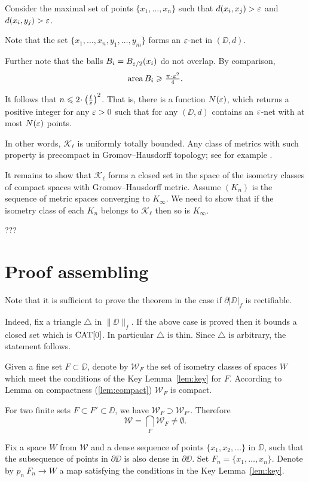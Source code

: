 \documentclass[a4paper,10pt]{amsart}
\begin{document}
Consider the maximal set of points $\{x_1,\dots,x_n\}$ such that $d(x_i,x_j)>\varepsilon$ and $d(x_i,y_j)>\varepsilon$.

Note that the set $\{x_1,\dots,x_n,y_1,\dots,y_m\}$
forms an $\varepsilon$-net in $(\DD,d)$.

Further note that the balls $B_i=B_{\varepsilon/2}(x_i)$
do not overlap.
By comparison,
\[\area B_i\ge \tfrac{\pi\cdot\eps^2}{4}.\]

It follows that $n\le 2\cdot\left(\tfrac\ell\eps\right)^2$.
That is, there is a function $N(\varepsilon)$,
which returns a positive integer for any $\varepsilon>0$
such that for any 
$(\DD,d)$ contains an $\varepsilon$-net
with at most $N(\varepsilon)$ points.

In other words, $\mathcal{K}_\ell$ is uniformly totally bounded.
Any class of metrics with such property is precompact in Gromov--Hausdorff topology; 
see for example \cite[7.4.15]{BBI}.

It remains to show that  $\mathcal{K}_\ell$ forms a closed set in the space of the isometry classes of compact spaces with Gromov--Hausdorff metric.
Assume $(K_n)$ is the sequence of metric spaces
converging to $K_\infty$.
We need to show that if the isometry class of each $K_n$ belongs to  
$\mathcal{K}_\ell$ then so is $K_\infty$.

???\qeds


\section{Proof assembling}

Note that it is sufficient to prove the theorem 
in the case if $\partial |\DD|_f$ is rectifiable.

Indeed, fix a triangle $\triangle$ in $\|\DD\|_f$.
If the above case is proved 
then it bounds a closed set which is $\mathop{\rm CAT}\nolimits[0]$.
In particular $\triangle$ is thin.
Since $\triangle$ is arbitrary, the statement follows.

Given a fine set $F\subset \DD$,
denote by $\mathcal{W}_F$
the set of isometry classes of spaces $W$ which meet the conditions of the Key Lemma~\ref{lem:key}
for $F$.
According to Lemma on compactness (\ref{lem:compact}) $\mathcal{W}_F$ is compact.

For two finite sets $F\subset F'\subset \DD$,
we have $\mathcal{W}_F\supset \mathcal{W}_{F'}$.
Therefore 
\[\mathcal{W}
=
\bigcap_{F}\mathcal{W}_F\ne \emptyset.\]

Fix a space $W$ from $\mathcal{W}$
and a dense sequence of points $\{x_1,x_2,\dots\}$ in $\DD$,
such that the subsequence of points in $\partial \DD$
is also dense in $\partial \DD$.
Set $F_n=\{x_1,\dots,x_n\}$.
Denote by $p_n\:F_n\to W$ a map satisfying the conditions in the Key Lemma~\ref{lem:key}.
\end{document}
